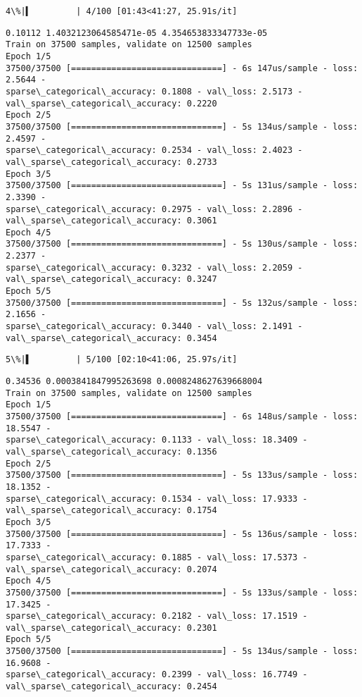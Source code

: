 \documentclass[11pt]{article}
\begin{document}
    \begin{Verbatim}[commandchars=\\\{\}]
  4\%|▍         | 4/100 [01:43<41:27, 25.91s/it]
    \end{Verbatim}

    \begin{Verbatim}[commandchars=\\\{\}]
0.10112 1.4032123064585471e-05 4.354653833347733e-05
Train on 37500 samples, validate on 12500 samples
Epoch 1/5
37500/37500 [==============================] - 6s 147us/sample - loss: 2.5644 -
sparse\_categorical\_accuracy: 0.1808 - val\_loss: 2.5173 -
val\_sparse\_categorical\_accuracy: 0.2220
Epoch 2/5
37500/37500 [==============================] - 5s 134us/sample - loss: 2.4597 -
sparse\_categorical\_accuracy: 0.2534 - val\_loss: 2.4023 -
val\_sparse\_categorical\_accuracy: 0.2733
Epoch 3/5
37500/37500 [==============================] - 5s 131us/sample - loss: 2.3390 -
sparse\_categorical\_accuracy: 0.2975 - val\_loss: 2.2896 -
val\_sparse\_categorical\_accuracy: 0.3061
Epoch 4/5
37500/37500 [==============================] - 5s 130us/sample - loss: 2.2377 -
sparse\_categorical\_accuracy: 0.3232 - val\_loss: 2.2059 -
val\_sparse\_categorical\_accuracy: 0.3247
Epoch 5/5
37500/37500 [==============================] - 5s 132us/sample - loss: 2.1656 -
sparse\_categorical\_accuracy: 0.3440 - val\_loss: 2.1491 -
val\_sparse\_categorical\_accuracy: 0.3454
    \end{Verbatim}

    \begin{Verbatim}[commandchars=\\\{\}]
  5\%|▌         | 5/100 [02:10<41:06, 25.97s/it]
    \end{Verbatim}

    \begin{Verbatim}[commandchars=\\\{\}]
0.34536 0.0003841847995263698 0.0008248627639668004
Train on 37500 samples, validate on 12500 samples
Epoch 1/5
37500/37500 [==============================] - 6s 148us/sample - loss: 18.5547 -
sparse\_categorical\_accuracy: 0.1133 - val\_loss: 18.3409 -
val\_sparse\_categorical\_accuracy: 0.1356
Epoch 2/5
37500/37500 [==============================] - 5s 133us/sample - loss: 18.1352 -
sparse\_categorical\_accuracy: 0.1534 - val\_loss: 17.9333 -
val\_sparse\_categorical\_accuracy: 0.1754
Epoch 3/5
37500/37500 [==============================] - 5s 136us/sample - loss: 17.7333 -
sparse\_categorical\_accuracy: 0.1885 - val\_loss: 17.5373 -
val\_sparse\_categorical\_accuracy: 0.2074
Epoch 4/5
37500/37500 [==============================] - 5s 133us/sample - loss: 17.3425 -
sparse\_categorical\_accuracy: 0.2182 - val\_loss: 17.1519 -
val\_sparse\_categorical\_accuracy: 0.2301
Epoch 5/5
37500/37500 [==============================] - 5s 134us/sample - loss: 16.9608 -
sparse\_categorical\_accuracy: 0.2399 - val\_loss: 16.7749 -
val\_sparse\_categorical\_accuracy: 0.2454
    \end{Verbatim}
\end{document}
